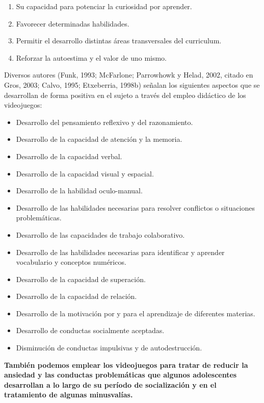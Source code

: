 \documentclass{bmcart}
\begin{document}
{\newline
\begin{enumerate}
	\item Su capacidad para potenciar la curiosidad por aprender.
	\item Favorecer determinadas habilidades.
	\item Permitir el desarrollo distintas áreas transversales del curriculum.
	\item Reforzar la autoestima y el valor de uno mismo.
\end{enumerate}
\newline
\newline
Diversos autores (Funk, 1993; McFarlone; Parrowhowk y Helad, 2002, citado en Gros, 2003; Calvo, 1995; Etxeberria, 1998b) señalan los siguientes aspectos que se desarrollan de forma positiva en el sujeto a través del empleo didáctico de los videojuegos:
\newline
\newline
\begin{itemize}
	\item Desarrollo del pensamiento reflexivo y del razonamiento.
	\item Desarrollo de la capacidad de atención y la memoria.
	\item Desarrollo de la capacidad verbal.
	\item Desarrollo de la capacidad visual y espacial.
	\item Desarrollo de la habilidad oculo-manual.
	\item Desarrollo de las habilidades necesarias para resolver conflictos o situaciones problemáticas.
	\item Desarrollo de las capacidades de trabajo colaborativo.
	\item Desarrollo de las habilidades necesarias para identificar y aprender vocabulario y conceptos numéricos.
	\item Desarrollo de la capacidad de superación.
	\item Desarrollo de la capacidad de relación.
	\item Desarrollo de la motivación por y para el aprendizaje de diferentes materias.
	\item Desarrollo de conductas socialmente aceptadas.
	\item Disminución de conductas impulsivas y de autodestrucción.
\end{itemize}

\textbf{También podemos emplear los videojuegos para tratar de reducir la ansiedad y las conductas problemáticas que algunos adolescentes desarrollan a lo largo de su período de socialización y en el tratamiento de algunas minusvalías.}

}
\end{document}
